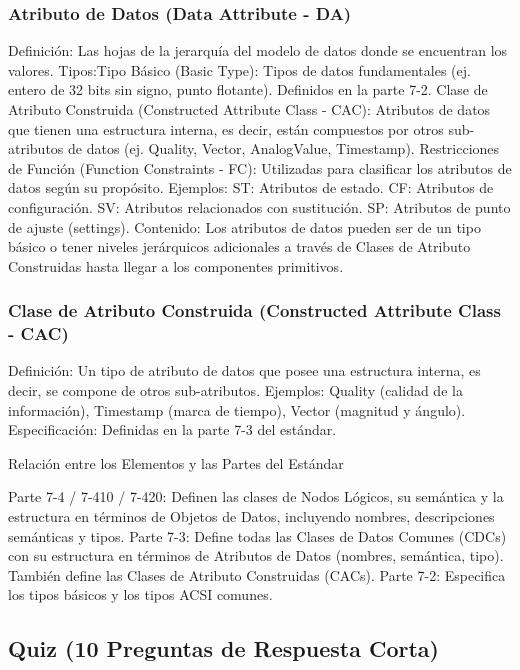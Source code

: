 \documentclass[a5paper]{book}%
\begin{document}
\subsubsection{Atributo de Datos (Data Attribute - DA)}

    Definición: Las hojas de la jerarquía del modelo de datos donde se encuentran los valores.
    Tipos:Tipo Básico (Basic Type): Tipos de datos fundamentales (ej. entero de 32 bits sin signo, punto flotante). Definidos en la parte 7-2.
    Clase de Atributo Construida (Constructed Attribute Class - CAC): Atributos de datos que tienen una estructura interna, es decir, están compuestos por otros sub-atributos de datos (ej. Quality, Vector, AnalogValue, Timestamp).
    Restricciones de Función (Function Constraints - FC): Utilizadas para clasificar los atributos de datos según su propósito. Ejemplos:
    ST: Atributos de estado.
    CF: Atributos de configuración.
    SV: Atributos relacionados con sustitución.
    SP: Atributos de punto de ajuste (settings).
    Contenido: Los atributos de datos pueden ser de un tipo básico o tener niveles jerárquicos adicionales a través de Clases de Atributo Construidas hasta llegar a los componentes primitivos.

\subsubsection{Clase de Atributo Construida (Constructed Attribute Class - CAC)}

    Definición: Un tipo de atributo de datos que posee una estructura interna, es decir, se compone de otros sub-atributos.
    Ejemplos: Quality (calidad de la información), Timestamp (marca de tiempo), Vector (magnitud y ángulo).
    Especificación: Definidas en la parte 7-3 del estándar.

Relación entre los Elementos y las Partes del Estándar

    Parte 7-4 / 7-410 / 7-420: Definen las clases de Nodos Lógicos, su semántica y la estructura en términos de Objetos de Datos, incluyendo nombres, descripciones semánticas y tipos.
    Parte 7-3: Define todas las Clases de Datos Comunes (CDCs) con su estructura en términos de Atributos de Datos (nombres, semántica, tipo). También define las Clases de Atributo Construidas (CACs).
    Parte 7-2: Especifica los tipos básicos y los tipos ACSI comunes.

\subsection{Quiz (10 Preguntas de Respuesta Corta)}
\end{document}
